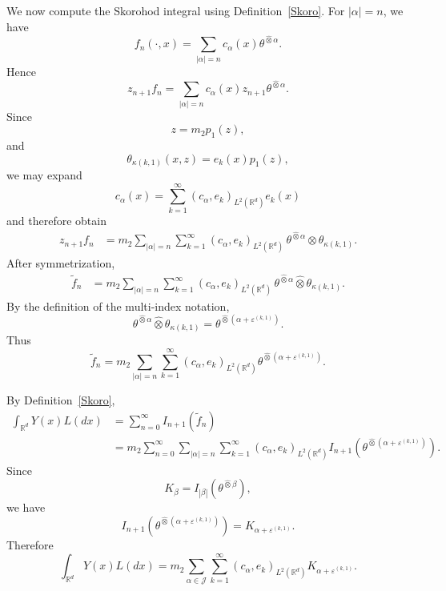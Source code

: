 \documentclass[12pt]{article}%
\numberwithin{equation}{section}
\begin{document}
We now compute the Skorohod integral using Definition~\ref{Skoro}.
For $|\alpha|=n$, we have
\[
f_n(\cdot,x)
=
\sum_{|\alpha|=n}
c_\alpha(x)\theta^{\hat\otimes\alpha}.
\]
Hence
\[
z_{n+1}f_n
=
\sum_{|\alpha|=n}
c_\alpha(x)
z_{n+1}
\theta^{\hat\otimes\alpha}.
\]
Since
\[
z=m_2p_1(z),
\]
and
\[
\theta_{\kappa(k,1)}(x,z)
=
e_k(x)p_1(z),
\]
we may expand
\[
c_\alpha(x)
=
\sum_{k=1}^{\infty}
(c_\alpha,e_k)_{L^2(\mathbb R^d)}e_k(x)
\]
and therefore obtain
\begin{align}
z_{n+1}f_n
&=
m_2
\sum_{|\alpha|=n}
\sum_{k=1}^{\infty}
(c_\alpha,e_k)_{L^2(\mathbb R^d)}
\,
\theta^{\hat\otimes\alpha}
\otimes
\theta_{\kappa(k,1)}.
\end{align}
After symmetrization,
\begin{align}
\widetilde f_n
&=
m_2
\sum_{|\alpha|=n}
\sum_{k=1}^{\infty}
(c_\alpha,e_k)_{L^2(\mathbb R^d)}
\,
\theta^{\hat\otimes\alpha}
\hat\otimes
\theta_{\kappa(k,1)}.
\end{align}
By the definition of the multi-index notation,
\[
\theta^{\hat\otimes\alpha}
\hat\otimes
\theta_{\kappa(k,1)}
=
\theta^{\hat\otimes
(\alpha+\varepsilon^{(k,1)})}.
\]
Thus
\begin{equation}
\widetilde f_n
=
m_2
\sum_{|\alpha|=n}
\sum_{k=1}^{\infty}
(c_\alpha,e_k)_{L^2(\mathbb R^d)}
\theta^{\hat\otimes
(\alpha+\varepsilon^{(k,1)})}.
\label{tilde-fn}
\end{equation}

By Definition~\ref{Skoro},
\begin{align}
\int_{\mathbb R^d}Y(x)L(dx)
&=
\sum_{n=0}^{\infty}
I_{n+1}(\widetilde f_n)\\
&=
m_2
\sum_{n=0}^{\infty}
\sum_{|\alpha|=n}
\sum_{k=1}^{\infty}
(c_\alpha,e_k)_{L^2(\mathbb R^d)}
I_{n+1}
\left(
\theta^{\hat\otimes
(\alpha+\varepsilon^{(k,1)})}
\right).
\end{align}
Since
\[
K_\beta
=
I_{|\beta|}
\left(
\theta^{\hat\otimes\beta}
\right),
\]
we have
\[
I_{n+1}
\left(
\theta^{\hat\otimes
(\alpha+\varepsilon^{(k,1)})}
\right)
=
K_{\alpha+\varepsilon^{(k,1)}}.
\]
Therefore
\begin{equation}
\int_{\mathbb R^d}Y(x)L(dx)
=
m_2
\sum_{\alpha\in\mathcal J}
\sum_{k=1}^{\infty}
(c_\alpha,e_k)_{L^2(\mathbb R^d)}
K_{\alpha+\varepsilon^{(k,1)}}.
\label{skor-expansion}
\end{equation}
\end{document}

